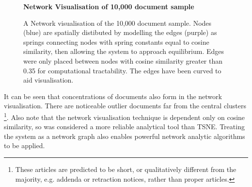 \begin{center}
\begin{figure}[H]
  \centering
  \textbf{Network Visualisation of 10,000 document sample}
    \caption[Network Visualisation of 10,000 document random sample]{A Network visualisation of the 10,000 document sample. Nodes (blue) are spatially distibuted by modelling the edges (purple) as springs connecting nodes with spring constants equal to cosine similarity, then allowing the system to approach equilibrium. Edges were only placed between nodes with cosine similarity greater than 0.35 for computational tractability. The edges have been curved to aid visualisation.}
    \label{fig:gephi_exp}

\end{figure} 
\end{center}
It can be seen that concentrations of documents also form in the network visualisation. There are noticeable outlier documents far from the central clusters \footnote{These articles are predicted to be short, or qualitatively different from the majority, e.g. addenda or retraction notices, rather than proper articles.}. Also note that the network visualisation technique is dependent only on cosine similarity, so was considered a more reliable analytical tool than TSNE. Treating the system as a network graph also enables powerful network analytic algorithms to be applied.